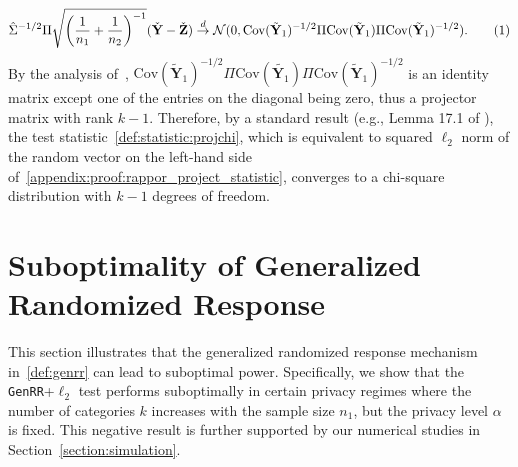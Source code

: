 \documentclass[twoside,11pt]{article}
\newcommand\numberthis{\addtocounter{equation}{1}\tag{\theequation}}
\newcommand{\vectorize}[1]{\mathbf{#1}}
\newcommand{\rvY}{Y}
\newcommand{\rVecY}{\vectorize{\rvY}}
\newcommand{\rvZ}{Z}
\newcommand{\rVecZ}{\vectorize{\rvZ}}
\newcommand{\alphabetSize}{k} %
\newcommand{\sampleSize}{n}
\newcommand{\privacyParameter}{\alpha} %
\begin{document}
\begin{appendix}
\begin{align*}
		\hat{\Sigma}^{-1/2} \Pi
		\sqrt{\biggl( \dfrac{1}{\sampleSize_1}+\dfrac{1}{\sampleSize_2} \biggr)^{-1}}
		(
		\check{\rVecY} 
		-
		\check{\rVecZ} 
		)
		\stackrel{d}{
			\to}
		\mathcal{N}(0,
		\mathrm{Cov}(\tilde{\rVecY}_1)^{-1/2} \Pi \mathrm{Cov}(\tilde{\rVecY}_1) \Pi \mathrm{Cov}(\tilde{\rVecY}_1)^{-1/2}).
		\numberthis \label{appendix:proof:rappor_project_statistic}
	\end{align*}
	By the analysis of~\citet{Gaboardi2018LDPChisq},	
	$\mathrm{Cov}(\tilde{\rVecY}_1)^{-1/2} \Pi \mathrm{Cov}(\tilde{\rVecY_1}) \Pi \mathrm{Cov}(\tilde{\rVecY}_1)^{-1/2}$ is an identity matrix except one of the entries on the diagonal being zero, thus a projector matrix with rank $\alphabetSize - 1$.
	Therefore, by a standard result (e.g., Lemma 17.1 of \citet{van_der_vaart_asymptotic_1998}), the test statistic~\eqref{def:statistic:projchi}, which is equivalent to squared $\ell_2$ norm of the random vector on the left-hand side of~\eqref{appendix:proof:rappor_project_statistic}, converges to a chi-square distribution with $\alphabetSize - 1$ degrees of freedom.
	\section{Suboptimality of Generalized Randomized Response}\label{genrr_suboptimal_theory}
	This section illustrates that  the generalized randomized response mechanism in~\eqref{def:genrr} can lead to suboptimal power. Specifically, we show that the \texttt{GenRR}+$\ell_2$ test performs suboptimally in certain privacy regimes where the number of categories $\alphabetSize$ increases with the sample size $\sampleSize_1$, but the privacy level $\privacyParameter$ is fixed. This negative result is further supported by our numerical studies in Section~\ref{section:simulation}. 
	

\end{appendix}
\end{document}
